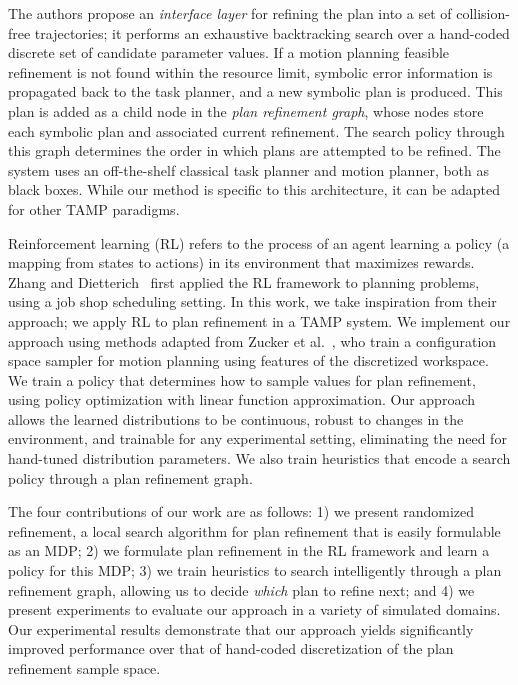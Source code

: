 The authors propose an \emph{interface layer} for refining the plan into a set
of collision-free trajectories; it performs an exhaustive
backtracking search over a hand-coded discrete set of candidate parameter values. If a motion
planning feasible refinement is not found within the resource limit,
symbolic error information is propagated back to the task planner, and a new symbolic plan is produced.
This plan is added as a child node in the \emph{plan refinement graph}, whose nodes store each
symbolic plan and associated current refinement. The search policy through this graph determines the order
in which plans are attempted to be refined. The system uses an off-the-shelf classical task planner and motion planner, both as black boxes.
While our method is specific to this architecture, it can be adapted for other TAMP paradigms.

Reinforcement learning (RL) refers to the process of an agent learning a policy (a mapping from states to actions)
in its environment that maximizes rewards. Zhang and Dietterich~\cite{JobShopSched} first applied the RL framework
to planning problems, using a job shop scheduling setting. In this work, we take inspiration from
their approach; we apply RL to plan refinement in a TAMP system. We implement our approach using methods adapted from
Zucker et al.~\cite{workspacebias}, who train a configuration space sampler for motion planning
using features of the discretized workspace. We train a policy that
determines how to sample values for plan refinement, using policy optimization with linear function
approximation. Our approach allows the learned distributions to be continuous, robust to changes in
the environment, and trainable for any experimental setting, eliminating the need for hand-tuned
distribution parameters. We also train heuristics that encode a search policy through a plan refinement graph.

The four contributions of our work are as follows: 1) we present randomized refinement, a local search
algorithm for plan refinement that is easily formulable as an MDP; 2) we formulate plan refinement in the
RL framework and learn a policy for this MDP; 3) we train heuristics to search intelligently
through a plan refinement graph, allowing us to decide \emph{which} plan to refine next;
and 4) we present experiments to evaluate our approach in a variety of simulated
domains. Our experimental results demonstrate that our approach yields significantly improved
performance over that of hand-coded discretization of the plan refinement sample space.
